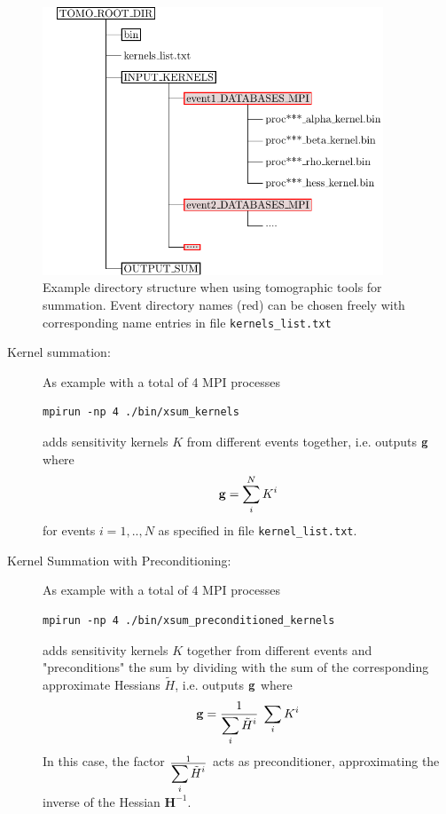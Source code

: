 \begin{figure}[htp]
\begin{centering}
\includegraphics[width=4in]{figures/tomo_dir_struct.pdf}
\par\end{centering}
%
\caption{
Example directory structure when using tomographic tools for summation. Event directory names (red) can be chosen freely with corresponding name entries in file \texttt{kernels\_list.txt}}
\label{fig:tomo-dir-struct}
\end{figure}


\begin{description}
\item [Kernel summation:] As example with a total of 4 MPI processes
\begin{verbatim}
mpirun -np 4 ./bin/xsum_kernels
\end{verbatim}
adds sensitivity kernels $K$ from different events together, i.e. outputs $\mathbf{g}$ where
\begin{equation}
\mathbf{g} = \displaystyle\sum^{N}_i K^{i} \nonumber
\end{equation}
for events $i = 1,..,N$ as specified in file \texttt{kernel\_list.txt}.

\item [Kernel Summation with Preconditioning:] As example with a total of 4 MPI processes
\begin{verbatim}
mpirun -np 4 ./bin/xsum_preconditioned_kernels
\end{verbatim}
adds sensitivity kernels $K$ together from different events and "preconditions" the sum by dividing with the sum of the corresponding approximate Hessians $\tilde{H}$, i.e. outputs $\mathbf{g}$ where
\begin{equation}
\mathbf{g} = \frac{1}{\displaystyle\sum_i \tilde{H}^{i}} \; \displaystyle\sum_i  K^{i} \nonumber
\end{equation}
In this case, the factor $\frac{1}{\displaystyle\sum_i \tilde{H}^{i}}$ acts as preconditioner, approximating the inverse of the Hessian $\mathbf{H}^{-1}$.
\end{description}

